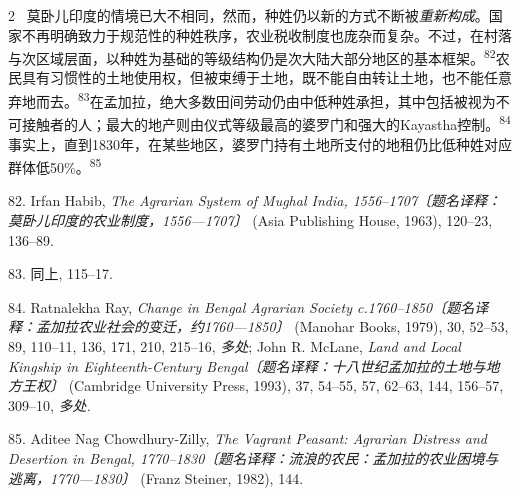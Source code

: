 \documentclass[10pt,a4paper]{article}
\begin{document}
\begin{paracol}{2}
\switchcolumn*
{\scriptsize\color{gray} [p. 17]}\ 莫卧儿印度的情境已大不相同，然而，种姓仍以新的方式不断被\textit{重新构成}。国家不再明确致力于规范性的种姓秩序，农业税收制度也庞杂而复杂。不过，在村落与次区域层面，以种姓为基础的等级结构仍是次大陆大部分地区的基本框\mbox{架。\textsuperscript{82}}农民具有习惯性的土地使用权，但被束缚于土地，既不能自由转让土地，也不能任意弃地而\mbox{去。\textsuperscript{83}}在孟加拉，绝大多数田间劳动仍由中低种姓承担，其中包括被视为不可接触者的人；最大的地产则由仪式等级最高的婆罗门和强大的Kayastha控\mbox{制。\textsuperscript{84}}事实上，直到1830年，在某些地区，婆罗门持有土地所支付的地租仍比低种姓对应群体低50\%。\nobreak\textsuperscript{85}\par{\small 82. Irfan Habib, \textit{The Agrarian System of Mughal India, 1556–1707〔题名译释：莫卧儿印度的农业制度，1556—1707〕} (Asia Publishing House, 1963), 120–23, 136–89.\par}{\small 83. 同上, 115–17.\par}{\small 84. Ratnalekha Ray, \textit{Change in Bengal Agrarian Society c.1760–1850〔题名译释：孟加拉农业社会的变迁，约1760—1850〕} (Manohar Books, 1979), 30, 52–53, 89, 110–11, 136, 171, 210, 215–16, \textit{多处}; John R. McLane, \textit{Land and Local Kingship in Eighteenth-Century Bengal〔题名译释：十八世纪孟加拉的土地与地方王权〕} (Cambridge University Press, 1993), 37, 54–55, 57, 62–63, 144, 156–57, 309–10, \textit{多处.}\par}{\small 85. Aditee Nag Chowdhury-Zilly, \textit{The Vagrant Peasant: Agrarian Distress and Desertion in Bengal, 1770–1830〔题名译释：流浪的农民：孟加拉的农业困境与逃离，1770—1830〕} (Franz Steiner, 1982), 144.\par}
\switchcolumn

\end{paracol}
\end{document}
